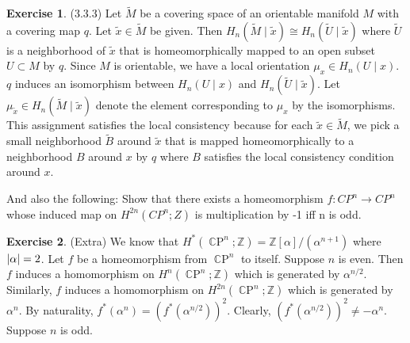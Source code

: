 \documentclass[12pt, psamsfonts]{amsart}
\theoremstyle{definition}
\newtheorem*{exer}{Exercise}
\theoremstyle{remark}
\DeclareMathOperator{\CP}{\mathbb{C}P}
\numberwithin{equation}{section}
\begin{document}
\begin{exer}{(3.3.3)}
  Let $\tilde{M}$ be a covering space of an orientable manifold $M$ with a covering map $q$.
  Let $\tilde{x} \in \tilde{M}$ be given.
  Then $H_n(\tilde{M} \mid \tilde{x}) \cong H_n(\tilde{U} \mid \tilde{x})$ where $\tilde{U}$ is a neighborhood of $\tilde{x}$ that is homeomorphically mapped to an open subset $U \subset M$ by $q$.
  Since $M$ is orientable, we have a local orientation $\mu_x \in H_n(U \mid x)$.
  $q$ induces an isomorphism between $H_n(U \mid x)$ and $H_n(\tilde{U} \mid \tilde{x})$.
  Let $\mu_{\tilde{x}} \in H_n(\tilde{M} \mid \tilde{x})$ denote the element corresponding to $\mu_x$ by the isomorphisms.
  This assignment satisfies the local consistency because for each $\tilde{x} \in \tilde{M}$, we pick a small neighborhood $\tilde{B}$ around $\tilde{x}$ that is mapped homeomorphically to a neighborhood $B$ around $x$ by $q$ where $B$ satisfies the local consistency condition around $x$.
\end{exer}

And also the following: Show that there exists a homeomorphism $f: CP^n \to CP^n$ whose induced map on $H^{2n}(CP^n;Z)$ is multiplication by -1 iff n is odd.

\begin{exer}{(Extra)}
  We know that $H^{\ast}(\CP^n; \mathbb{Z}) = \mathbb{Z}[\alpha] / (\alpha^{n + 1})$ where $\abs{\alpha} = 2$.
  Let $f$ be a homeomorphism from $\CP^n$ to itself.
  Suppose $n$ is even.
  Then $f$ induces a homomorphism on $H^n(\CP^n; \mathbb{Z})$ which is generated by $\alpha^{n / 2}$.
  Similarly, $f$ induces a homomorphism on $H^{2n}(\CP^n; \mathbb{Z})$ which is generated by $\alpha^{n}$.
  By naturality, $f^{\ast}(\alpha^n) = (f^{\ast}(\alpha^{n / 2}))^2$.
  Clearly, $(f^{\ast}(\alpha^{n / 2}))^2 \ne -\alpha^n$.
  Suppose $n$ is odd.
\end{exer}
\end{document}
